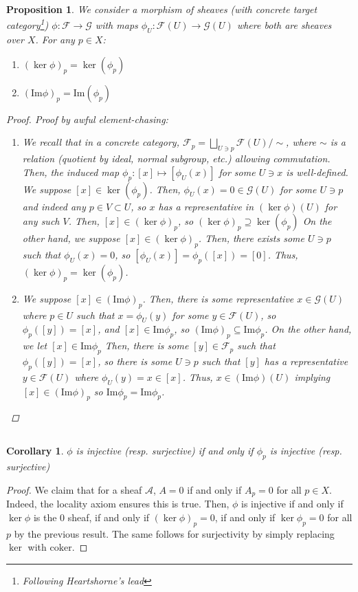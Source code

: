 \documentclass[english]{article}
\newcommand{\FF}{\mathscr{F}}
\newcommand{\GG}{\mathscr{G}}
\newcommand{\prob}[1]{\setcounter{section}{#1-1}\section{}}
\newcommand{\prt}[1]{\setcounter{subsection}{#1-1}\subsection{}}
\newtheorem*{proposition*}{Proposition}
\newtheorem*{corollary*}{Corollary}
\theoremstyle{remark}
\theoremstyle{definition}
\newcommand{\im}{\mathrm{Im}}
\begin{document}
\prob{8}\prt{1} \begin{proposition*}We consider a morphism of sheaves (with concrete target category\footnote{Following Heartshorne's lead\textellipsis}) $\phi:\FF\to \GG$ with maps $\phi_U:\FF(U)\to \GG(U)$ where both are sheaves over $X$. For any $p\in X$:
	\begin{enumerate}[label=\emph{\roman*)}]
	\item $(\ker\phi)_p=\ker(\phi_p)$
	\item $(\im\phi)_p=\im(\phi_p)$
	\end{enumerate}
\begin{proof}Proof by awful element-chasing:
	\begin{enumerate}[label=\emph{\roman*)}]
		\item We recall that in a concrete category, $\FF_p=\bigsqcup_{U\ni p} \FF(U)/\sim$, where $\sim$ is a relation (quotient by ideal, normal subgroup, etc.) allowing commutation. Then, the induced map $\phi_p: [x]\mapsto [\phi_U(x)]$ for some $U\ni x$ is well-defined. We suppose $[x]\in \ker(\phi_p)$. Then, $\phi_U(x)=0\in \GG(U)$ for some $U\ni p$ and indeed any $p\in V\subset U$, so $x$ has a representative in $(\ker\phi)(U)$ for any such $V$. Then, $[x]\in (\ker\phi)_p$, so $(\ker\phi)_p\supseteq\ker(\phi_p)$ On the other hand, we suppose $[x]\in (\ker\phi)_p$. Then, there exists some $U\ni p$ such that $\phi_U(x)=0$, so $[\phi_U(x)]=\phi_p([x])=[0]$. Thus, $(\ker\phi)_p=\ker(\phi_p)$.
\item We suppose $[x]\in (\im\phi)_p$. Then, there is some representative $x\in \GG(U)$ where $p\in U$ such that $x=\phi_U(y)$ for some $y\in \FF(U)$, so $\phi_p([y])=[x]$, and $[x]\in \im\phi_p$, so $(\im\phi)_p\subseteq \im\phi_p$. On the other hand, we let $[x]\in \im\phi_p$ Then, there is some $[y]\in \FF_p$ such that $\phi_p([y])=[x]$, so there is some $U\ni p$ such that $[y]$ has a representative $y\in \FF(U)$ where $\phi_U(y)=x\in[x]$. Thus, $x\in (\im\phi)(U)$ implying $[x]\in(\im\phi)_p$ so $\im\phi_p= \im\phi_p$.
	\end{enumerate}\end{proof}\end{proposition*}
\prt{2}\begin{corollary*}
	$\phi$ is injective (resp. surjective) if and only if $\phi_p$ is injective (resp. surjective)
\end{corollary*}\begin{proof}
We claim that for a sheaf $\mathscr{A}$, $A=0$ if and only if $A_p=0$ for all $p\in X$. Indeed, the locality axiom ensures this is true. Then, $\phi$ is injective if and only if $\ker\phi$ is the $0$ sheaf, if and only if $(\ker\phi)_p=0$, if and only if $\ker\phi_p=0$ for all $p$ by the previous result.  The same follows for surjectivity by simply replacing $\ker$ with $\mathrm{coker}$.\end{proof}
\end{document}
